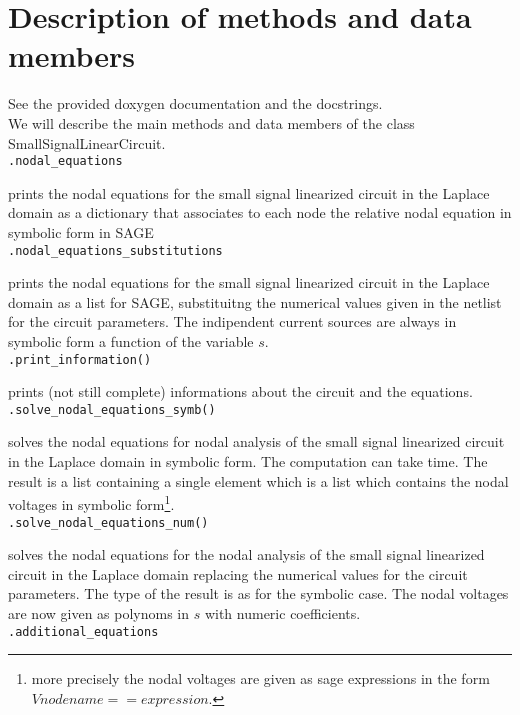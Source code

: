 \documentclass[a4paper]{article}
\begin{document}
\section{Description of methods and data members} 
See the provided doxygen documentation and the docstrings.\\

We will describe the main methods and data members of the class {SmallSignalLinearCircuit}.\\

{\tt .nodal\_equations}

prints the nodal equations for the small signal linearized circuit in the Laplace domain as a dictionary that associates to each node the relative nodal equation in symbolic form in SAGE\\

{\tt .nodal\_equations\_substitutions}

prints the nodal equations for the small signal linearized circuit in the Laplace domain as a list for SAGE, substituitng the numerical values given in the netlist for the circuit parameters. The indipendent current sources are always in symbolic form a function of the variable $s$.\\

{\tt .print\_information()}

prints (not still complete) informations about the circuit and the equations.\\

{\tt .solve\_nodal\_equations\_symb()}

solves the nodal equations for nodal analysis of the small signal linearized circuit in the Laplace domain in symbolic form. The computation can take time. The result is a list containing a single element which is a list which contains the nodal voltages in symbolic form\footnote{more precisely the nodal voltages are given as sage expressions in the form $Vnodename == expression$.}.\\

{\tt .solve\_nodal\_equations\_num()}

solves the nodal equations for the nodal analysis of the small signal linearized circuit in the Laplace domain replacing the numerical values for the circuit parameters. The type of the result is as for the symbolic case. The nodal voltages are now given as polynoms in $s$ with numeric coefficients.\\

{\tt .additional\_equations}
\end{document}
